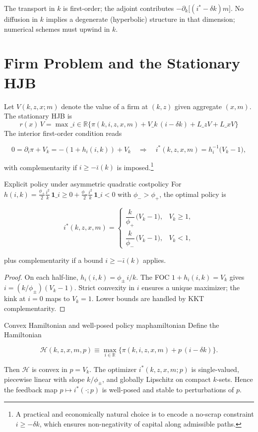 \documentclass[11pt,letterpaper,oneside]{article}
\numberwithin{equation}{section}
\newcommand{\ac}[1]{\textsc{#1}}
\newcommand{\R}{\mathbb{R}}
\newcommand{\1}{\mathbf{1}}
\newcommand{\Lz}{L\_z}
\newcommand{\Lx}{L\_x}
\newcommand{\ind}[1]{\mathbf{1}\_{{#1}}}
\newcommand{\kbar}{\bar\iota}
\begin{document}
The transport in $k$ is first-order; the adjoint contributes $-\partial_k\big[(i^*-\delta k)m\big]$. No diffusion in $k$ implies a degenerate (hyperbolic) structure in that dimension; numerical schemes must upwind in $k$.

\section{Firm Problem and the Stationary HJB}

Let $V(k,z,x;m)$ denote the value of a firm at $(k,z)$ given aggregate $(x,m)$. The stationary \ac{HJB} is
\begin{equation}
\boxed{\; r(x)\,V 
  = \max\_{i\in\R} \Big\{ \pi(k,i,z,x,m) + V\_k\,(i-\delta k) + \Lz V + \Lx V \Big\} \;}
\tag{HJB}\label{eq:HJB}
\end{equation}
The interior first-order condition reads

$$
0=\partial_i\pi+V_k=-(1+h_i(i,k))+V_k
\quad\Longrightarrow\quad
i^*(k,z,x,m)=h_i^{-1}\!\big(V_k-1\big),
$$

with complementarity if $i\ge -\kbar(k)$ is imposed.\footnote{A practical and economically natural choice is to encode a no-scrap constraint $i\ge -\delta k$, which ensures non-negativity of capital along admissible paths.}

\begin{proposition}{Explicit policy under asymmetric quadratic cost}{policy}
For
$h(i,k)=\tfrac{\phi_+}{2}\tfrac{i^2}{k}\,\ind{i\ge 0}
+\tfrac{\phi_-}{2}\tfrac{i^2}{k}\,\ind{i<0}$
with $\phi_->\phi_+$, the optimal policy is

$$
i^*(k,z,x,m)=
\begin{cases}
\dfrac{k}{\phi_+}\,\big(V_k-1\big), & V_k\ge 1,\\[6pt]
\dfrac{k}{\phi_-}\,\big(V_k-1\big), & V_k< 1,
\end{cases}
$$

plus complementarity if a bound $i\ge -\kbar(k)$ applies.
\end{proposition}

\begin{proof}
On each half-line, $h_i(i,k)=\phi_\pm\,i/k$. The FOC $1+h_i(i,k)=V_k$ gives $i=(k/\phi_\pm)(V_k-1)$. Strict convexity in $i$ ensures a unique maximizer; the kink at $i=0$ maps to $V_k=1$. Lower bounds are handled by KKT complementarity.
\end{proof}

\begin{proposition}{Convex Hamiltonian and well-posed policy map}{hamiltonian}
Define the Hamiltonian

$$
\mathcal{H}(k,z,x,m,p)\equiv \max_{i\in\R}\{\pi(k,i,z,x,m)+p\,(i-\delta k)\}.
$$

Then $\mathcal{H}$ is convex in $p=V_k$. The optimizer $i^*(k,z,x,m;p)$ is single-valued, piecewise linear with slope $k/\phi_\pm$, and globally Lipschitz on compact $k$-sets. Hence the feedback map $p\mapsto i^*(\cdot;p)$ is well-posed and stable to perturbations of $p$.
\end{proposition}
\end{document}
